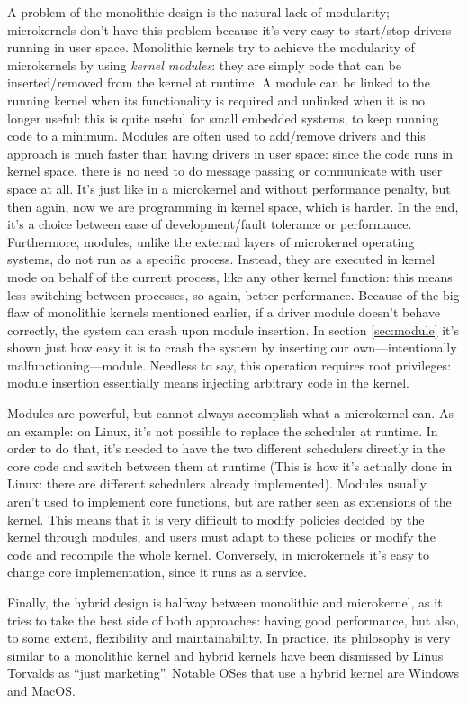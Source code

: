 A problem of the monolithic design is the natural lack of modularity; microkernels don't have this problem because it's very easy to start/stop drivers running in user space. Monolithic kernels try to achieve the modularity of microkernels by using \textit{kernel modules}: they are simply code that can be inserted/removed from the kernel at runtime. A module can be linked to the running kernel when its functionality is required and unlinked when it is no longer useful: this is quite useful for small embedded systems, to keep running code to a minimum. Modules are often used to add/remove drivers and this approach is much faster than having drivers in user space: since the code runs in kernel space, there is no need to do message passing or communicate with user space at all. It's just like in a microkernel and without performance penalty, but then again, now we are programming in kernel space, which is harder. In the end, it's a choice between ease of development/fault tolerance or performance. Furthermore, modules, unlike the external layers of microkernel operating systems, do not run as a specific process. Instead, they are executed in kernel mode on behalf of the current process, like any other kernel function: this means less switching between processes, so again, better performance. Because of the big flaw of monolithic kernels mentioned earlier, if a driver module doesn't behave correctly, the system can crash upon module insertion. In section \ref{sec:module} it's shown just how easy it is to crash the system by inserting our own---intentionally malfunctioning---module. Needless to say, this operation requires root privileges: module insertion essentially means injecting arbitrary code in the kernel.

Modules are powerful, but cannot always accomplish what a microkernel can. As an example: on Linux, it's not possible to replace the scheduler at runtime. In order to do that, it's needed to have the two different schedulers directly in the core code and switch between them at runtime (This is how it's actually done in Linux: there are different schedulers already implemented). Modules usually aren't used to implement core functions, but are rather seen as extensions of the kernel. This means that it is very difficult to modify policies decided by the kernel through modules, and users must adapt to these policies or modify the code and recompile the whole kernel. Conversely, in microkernels it's easy to change core implementation, since it runs as a service.

Finally, the hybrid design is halfway between monolithic and microkernel, as it tries to take the best side of both approaches: having good performance, but also, to some extent, flexibility and maintainability. In practice, its philosophy is very similar to a monolithic kernel and hybrid kernels have been dismissed by Linus Torvalds as ``just marketing''\cite{torvalds}. Notable OSes that use a hybrid kernel are Windows and MacOS.

